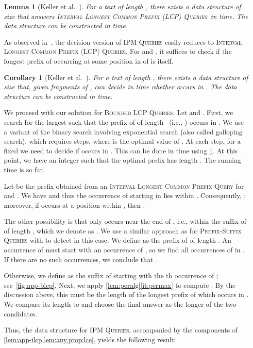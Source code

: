 \documentclass[a4paper]{article}
\newtheorem{lemma}[theorem]{Lemma}
\newtheorem{corollary}[theorem]{Corollary}
\theoremstyle{definition}
\theoremstyle{remark}
\newcommand{\IPM}{\textsc{IPM Queries}\xspace}
\newcommand{\BQ}{\textsc{Prefix-Suffix Queries}\xspace}
\newcommand{\BLCP}{\textsc{Bounded LCP Queries}\xspace}
\newcommand{\ILCP}{\textsc{Interval Longest Common Prefix (LCP) Queries}\xspace}
\begin{document}
\begin{lemma}[Keller et al.~\cite{DBLP:journals/tcs/KellerKFL14}]\label{lem:app-ilcp}
For a text  of length , there exists a data structure of size  that answers \ILCP\ in  time.
The data structure can be constructed in  time.
\end{lemma}

As observed in~\cite{DBLP:journals/tcs/KellerKFL14}, the decision version of \IPM easily reduces to \ILCP. For 
and , it suffices to check if the longest prefix of  occurring at some position in  of  is  itself.\begin{corollary}[Keller et al.~\cite{DBLP:journals/tcs/KellerKFL14}]\label{lem:any}
For a text  of length , there exists a data structure of size  that, given fragments  of , can decide in  time whether  occurs in .
The data structure can be constructed in  time.
\end{corollary}

We proceed with our solution for \BLCP.
Let  and .
First, we search for the largest  such that the prefix of  of length~ (i.e., ) occurs in .
We use a variant of the binary search involving exponential search (also called galloping search),
which requires  steps, where  is the optimal value of .
At each step, for a fixed  we need to decide if  occurs in .
This can be done in  time using \cref{lem:any}.
At this point, we have an integer  such that the optimal prefix  has length .
The running time is  so far.

Let  be the prefix obtained from an \textsc{Interval Longest Common Prefix Query} for  and .
We have  and thus the occurrence of  starting in  lies within .
Consequently, ; moreover, if  occurs at a position within ,
then .

The other possibility is that  only occurs near the end of , i.e., within the suffix of  of length , which we denote as .
We use a similar approach as for \BQ with  to detect  in this case.
We define  as the prefix of  of length .
An occurrence of  must start with an occurrence of , so we find all occurrences of  in .
If there are no such occurrences, we conclude that .

Otherwise, we define  as the suffix of  starting with the th occurrence of ; see~\cref{fig:app-blcp}.
Next, we apply \cref{lem:peralg}\ref{it:permax} to compute . By the discussion above,
this must be the length of the longest prefix of  which occurs in .
We compare its length to  and choose the final answer  as the longer of the two candidates.

Thus, the data structure for \IPM, accompanied by the components of \cref{lem:app-ilcp,lem:any,prop:lce},
yields the following result:
\end{document}
